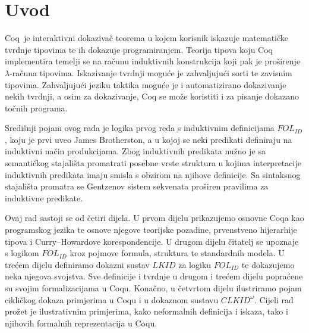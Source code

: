 \chapter*{Uvod}\label{cha:uvod}
Coq\, je interaktivni dokazivač teorema u kojem
korisnik iskazuje matematičke tvrdnje tipovima te ih dokazuje programiranjem.
Teorija tipova koju Coq implementira temelji se na računu induktivnih konstrukcija
koji pak je proširenje \(\lambda\)-računa tipovima.
Iskazivanje tvrdnji moguće je zahvaljujući sorti \coqprop{} te zavisnim tipovima.
Zahvaljujući jeziku taktika moguće je i automatizirano dokazivanje nekih tvrdnji,
a osim za dokazivanje, Coq se može koristiti i za pisanje dokazano točnih programa.

Središnji pojam ovog rada je logika prvog reda s induktivnim definicijama
\(\mathit{FOL}_{\mathit{ID}}\), koju je prvi uveo James Brotherston, a u kojoj
se neki predikati definiraju na induktivni način produkcijama.
Zbog induktivnih predikata nužno je sa semantičkog stajališta promatrati
posebne vrste struktura u kojima interpretacije induktivnih predikata imaju smisla
s obzirom na njihove definicije.
Sa sintaksnog stajališta promatra se Gentzenov sistem sekvenata proširen
pravilima za induktivne predikate.

Ovaj rad sastoji se od četiri dijela.
U prvom dijelu prikazujemo osnovne Coqa kao programskog jezika te osnove njegove
teorijske pozadine, prvenstveno hijerarhije tipova i Curry--Howardove korespondencije.
U drugom dijelu čitatelj se upoznaje s logikom \(\mathit{FOL}_{\mathit{ID}}\) kroz
pojmove formula, struktura te standardnih modela.
U trećem dijelu definiramo dokazni sustav \(\mathit{LKID}\) za logiku \(\mathit{FOL}_{\mathit{ID}}\)
te dokazujemo neka njegova svojstva.
Sve definicije i tvrdnje u drugom i trećem dijelu popraćene su svojim formalizacijama u Coqu.
Konačno, u četvrtom dijelu ilustriramo pojam cikličkog dokaza primjerima u Coqu i u dokaznom
sustavu \(\mathit{CLKID}^{\omega}\)\!.
Cijeli rad prožet je ilustrativnim primjerima, kako neformalnih definicija i iskaza,
tako i njihovih formalnih reprezentacija u Coqu.



